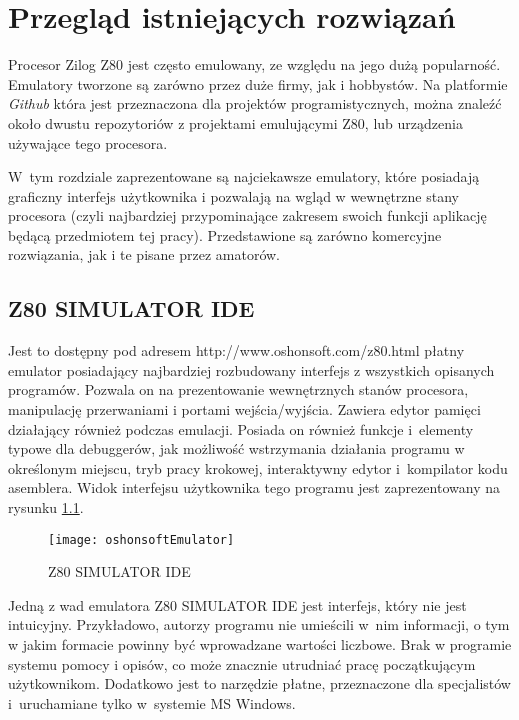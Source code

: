 \chapter{Przegląd istniejących rozwiązań}
	Procesor Zilog Z80 jest często emulowany, ze względu na jego dużą popularność. Emulatory tworzone są zarówno przez duże firmy, jak i hobbystów. Na platformie \emph{Github}  która jest przeznaczona dla projektów programistycznych, można znaleźć około dwustu repozytoriów z projektami emulującymi Z80, lub urządzenia używające tego procesora. %

	W~tym rozdziale zaprezentowane są najciekawsze emulatory, które posiadają graficzny interfejs użytkownika i pozwalają na wgląd w wewnętrzne stany procesora (czyli najbardziej przypominające zakresem swoich funkcji aplikację będącą przedmiotem tej pracy). Przedstawione są zarówno komercyjne rozwiązania, jak i te pisane przez amatorów.
	
	\section{Z80 SIMULATOR IDE}
	Jest to dostępny pod adresem http://www.oshonsoft.com/z80.html płatny emulator posiadający najbardziej rozbudowany interfejs z wszystkich opisanych programów. 
	Pozwala on na prezentowanie wewnętrznych stanów procesora, manipulację przerwaniami i portami wejścia/wyjścia. Zawiera edytor pamięci działający również podczas emulacji. 
	Posiada on również funkcje i~elementy typowe dla debuggerów, jak możliwość wstrzymania działania programu w określonym miejscu, tryb pracy krokowej, interaktywny edytor i~kompilator kodu asemblera\cite{oshonsoftEmulator}. Widok interfejsu użytkownika tego programu jest zaprezentowany na rysunku \ref{img:oshonsoftEmulator}.
	
	\begin{figure}[h]
		\centering
		\texttt{[image: oshonsoftEmulator]}
		\caption{Z80 SIMULATOR IDE}
		\label{img:oshonsoftEmulator}
	\end{figure}
	
	Jedną z wad emulatora Z80 SIMULATOR IDE jest interfejs, który nie jest intuicyjny. Przykładowo, autorzy programu nie umieścili w~nim informacji, o tym w jakim formacie powinny być wprowadzane wartości liczbowe. Brak w programie systemu pomocy i opisów, co może znacznie utrudniać pracę początkującym użytkownikom. Dodatkowo jest to narzędzie płatne, przeznaczone dla specjalistów i~uruchamiane tylko w~systemie MS Windows.
	
